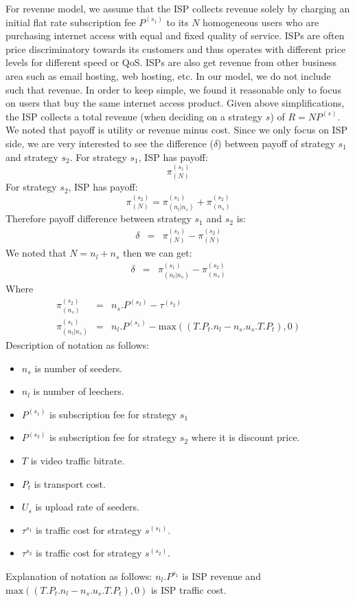 \documentclass[paper]{ieice}
\begin{document}
For revenue model, we assume that the ISP collects revenue solely by charging an initial flat rate subscription fee $P^{(s_1)}$ to its $N$ homogeneous users who are purchasing internet access with equal and fixed quality of service.
ISPs are often price discriminatory towards its customers and thus operates with different price levels for different speed or QoS.
ISPs are also get revenue from other business area such as email hosting, web hosting, etc. 
In our model, we do not include such that revenue. 
In order to keep simple, we found it reasonable only to focus on users that buy the same internet access product. 
Given above simplifications, the ISP collects a total revenue (when deciding on a strategy $s$) of $R = N P^{(s)}$.
We noted that payoff is utility or revenue minus cost.  
Since we only focus on ISP side, we are very interested to see the difference ($\delta$) between payoff of strategy $s_1$ and strategy $s_2$.
For strategy $s_1$, ISP has payoff: 
\begin{equation}
	\pi^{(s_1)}_{(N)} 
\end{equation}
For strategy $s_2$, ISP has payoff:
\begin{equation}
	\pi^{(s_2)}_{(N)} = \pi^{(s_1)}_{(n_l | n_s)} + \pi^{(s_2)}_{(n_s)}
\end{equation}
Therefore payoff difference between strategy $s_1$ and $s_2$ is:
\begin{eqnarray}
	\delta &=& \pi^{(s_1)}_{(N)} - \pi^{(s_2)}_{(N)}
\end{eqnarray}
We noted that $N=n_l + n_s$ then we can get: 
\begin{eqnarray}
	\delta &=& \pi^{(s_1)}_{(n_l|n_s)} - \pi^{(s_2)}_{(n_s)}
\end{eqnarray}
Where 
\begin{eqnarray}
	\pi^{(s_2)}_{(n_s)} &=& n_s . P^{(s_2)} - \tau^{(s_2)}\\
	\pi^{(s_1)}_{(n_l|n_s)} &=& n_l . P^{(s_1)} - \text{max}((T.P_t.n_l - n_s . u_s .T .P_t),0) \label{eq:pi^s1_nl_nl}
\end{eqnarray}
Description of notation as follows:
\begin{itemize}
	\item $n_s$ is number of seeders.
	\item $n_l$ is number of leechers.
	\item $P^{(s_1)}$ is subscription fee for strategy $s_1$
	\item $P^{(s_2)}$ is subscription fee for strategy $s_2$ where it is discount price.
	\item $T$ is video traffic bitrate. 
	\item $P_t$ is transport cost. 
	\item $U_s$ is upload rate of seeders.
	\item $\tau^{s_1}$ is traffic cost for strategy $s^{(s_1)}$.
	\item $\tau^{s_2}$ is traffic cost for strategy $s^{(s_2)}$.
\end{itemize}
Explanation of notation as follows:
$n_l . P^{s_1}$ is ISP revenue and $\text{max}((T.P_t.n_l - n_s . u_s .T .P_t),0)$ is ISP traffic cost.
\end{document}
